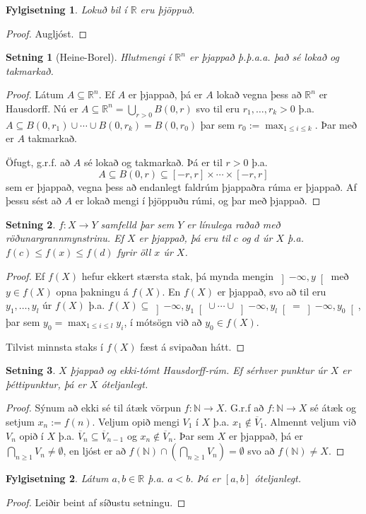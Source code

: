 \documentclass[a4paper,icelandic]{book}
\theoremstyle{definition}
\theoremstyle{plain}
\newtheorem{setn}{Setning}[section]
\newtheorem{fylgisetn}{Fylgisetning}[section]
\theoremstyle{remark}
\newcommand{\R}{\mathbb{R}} %
\newcommand{\N}{\mathbb{N}} %
\begin{document}
\begin{fylgisetn}
  Lokuð bil í $\R$ eru þjöppuð.
\end{fylgisetn}
\begin{proof}
  Augljóst.
\end{proof}
\begin{setn}
  [Heine-Borel]
  Hlutmengi í $\R^n$ er þjappað \emph{þ.þ.a.a.} það sé lokað og takmarkað.
\end{setn}
\begin{proof}
  Látum $A\subseteq\R^n$. Ef $A$ er þjappað, þá er $A$ lokað vegna
  þess að $\R^n$ er Hausdorff. Nú er $A\subseteq \R^n = \bigcup_{r>0}
  B(0,r)$ svo til eru $r_1,\dots,r_k > 0$ þ.a. $A\subseteq
  B(0,r_1)\cup\cdots\cup B(0,r_k) = B(0,r_0)$ þar sem $r_0 :=
  \max_{1\leq i\leq k}$. Þar með er $A$ takmarkað.

  Öfugt, g.r.f. að $A$ sé lokað og takmarkað. Þá er til $r>0$ þ.a.
  \[
  A\subseteq B(0,r)
  \subseteq \left[-r,r\right]\times\cdots\times\left[-r,r\right]
  \]
  sem er þjappað, vegna þess að endanlegt faldrúm þjappaðra rúma er
  þjappað. Af þessu sést að $A$ er lokað mengi í þjöppuðu rúmi, og þar
  með þjappað.    
\end{proof}
\begin{setn}
  $f: X\to Y$ samfelld þar sem $Y$ er línulega raðað með
  röðunargrannmynstrinu. Ef $X$ er þjappað, þá eru til $c$ og $d$ úr
  $X$ þ.a. $f(c)\leq f(x)\leq f(d)$ fyrir öll $x$ úr $X$.
\end{setn}
\begin{proof}
  Ef $f(X)$ hefur ekkert stærsta stak, þá mynda mengin
  $\left]-\infty,y\right[$ með $y\in f(X)$ opna þakningu á $f(X)$. En
  $f(X)$ er þjappað, svo að til eru $y_1,\dots,y_l$ úr $f(X)$
  þ.a. $f(X)\subseteq
  \left]-\infty,y_1\right[\cup\cdots\cup\left]-\infty,y_l\right[ =
  \left]-\infty,y_0\right[$, þar sem $y_0 = \max_{1\leq i\leq l} y_i$,
  í mótsögn við að $y_0\in f(X)$.

  Tilvist minnsta staks í $f(X)$ fæst á svipaðan hátt.
\end{proof}
\begin{setn}
  $X$ þjappað og ekki-tómt Hausdorff-rúm. Ef sérhver punktur úr $X$ er
  þéttipunktur, þá er $X$ óteljanlegt.
\end{setn}
\begin{proof}
  Sýnum að ekki sé til átæk vörpun $f:\N\to X$. G.r.f að $f:\N\to X$
  sé átæk og setjum $x_n := f(n)$. Veljum opið mengi $V_1$ í $X$
  þ.a. $x_1\notin\overline V_1$. Almennt veljum við $V_n$ opið í $X$
  þ.a. $\overline V_n\subseteq \overline V_{n-1}$ og $x_n\notin
  \overline V_n$. Þar sem $X$ er þjappað, þá er $\bigcap_{n\geq
    1}V_n\neq\emptyset$, en ljóst er að $f(\N)\cap\left(\bigcap_{n\geq
    1} V_n\right) = \emptyset$ svo að $f(\N) \neq X$.
\end{proof}
\begin{fylgisetn}
  Látum $a,b\in\R$  þ.a. $a<b$. Þá er $\left[a,b\right]$ óteljanlegt.
\end{fylgisetn}
\begin{proof}
  Leiðir beint af síðustu setningu.
\end{proof}
\end{document}
